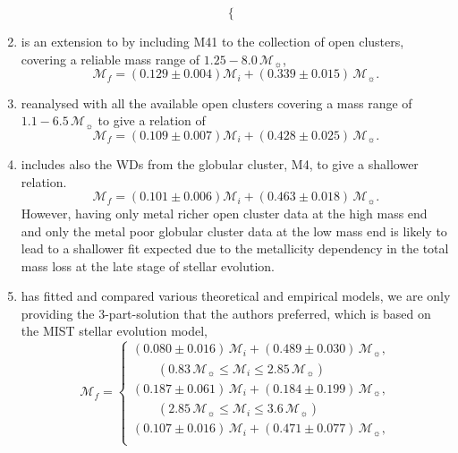 \documentclass[fleqn,usenatbib]{rasti}
\newcommand{\msun}{\mathcal{M}_{\sun}}
\begin{document}
\begin{enumerate}
\begin{equation}
\begin{cases}
              \end{cases}
    \end{equation}
    \item \citet{2009ApJ...693..355W} is an extension to \citet{2009ApJ...692.1013S} by including M41 to the collection of open clusters, covering a reliable mass range of $1.25-8.0\,\msun$,
    \begin{equation}
        \mathcal{M}_f = (0.129 \pm 0.004) \mathcal{M}_i + (0.339 \pm 0.015)\,\msun.
    \end{equation}
    \item \citet{2009ApJ...705..408K} reanalysed with all the available open clusters covering a mass range of $1.1-6.5\,\msun$ to give a relation of
    \begin{equation}
        \mathcal{M}_f = (0.109 \pm 0.007) \mathcal{M}_i + (0.428 \pm 0.025)\,\msun.
    \end{equation}
    \item \citet[][extended]{2009ApJ...705..408K} includes also the WDs from the globular cluster, M4, to give a shallower relation.
    \begin{equation}
        \mathcal{M}_f = (0.101 \pm 0.006) \mathcal{M}_i + (0.463 \pm 0.018)\,\msun.
    \end{equation}
    However, having only metal richer open cluster data at the high mass end and only the metal poor globular cluster data at the low mass end is likely to lead to a shallower fit expected due to the metallicity dependency in the total mass loss at the late stage of stellar evolution.
    \item \citet{2018ApJ...866...21C} has fitted and compared various theoretical and empirical models, we are only providing the 3-part-solution that the authors preferred, which is based on the MIST stellar evolution model,
    \begin{equation}
        \mathcal{M}_f = \begin{cases}
                  (0.080 \pm 0.016)\,\mathcal{M}_i + (0.489 \pm 0.030)\,\msun,\\
                  \qquad(0.83\,\msun \leq \mathcal{M}_i \leq 2.85\,\msun)\\
                  (0.187 \pm 0.061)\,\mathcal{M}_i + (0.184 \pm 0.199)\,\msun,\\
                  \qquad(2.85\,\msun \leq \mathcal{M}_i \leq 3.6\,\msun)\\
                  (0.107 \pm 0.016)\,\mathcal{M}_i + (0.471 \pm 0.077)\,\msun,\\

\end{cases}
\end{equation}
\end{enumerate}
\end{document}
